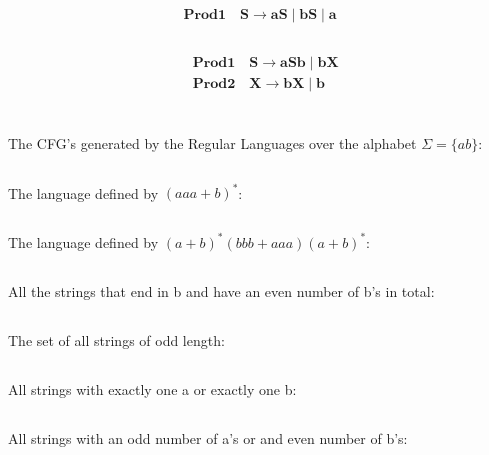 \documentclass[12pt,a4paper,oneside]{report}
\begin{document}
\section{}
\subsection{}
\begin{equation}
\mathbf {Prod 1 \quad  S \to aS \mid bS \mid a}
\end{equation}
\subsection{}
\begin{equation}
\begin{split}
&\mathbf {Prod 1 \quad  S \to aSb \mid bX}\\
&\mathbf{Prod 2 \quad X \to bX \mid b}
\end{split}
\end{equation}
\section{}
The CFG's generated by the Regular Languages over the alphabet $\Sigma = \{a b \}$:
\subsection{}
The language defined by $(aaa + b)^*$:
\subsection{}
The language defined by $(a + b)^*(bbb + aaa)(a + b)^*$:
\subsection{}
All the strings that end in b and have an even number of b's in total:
\subsection{}
The set of all strings of odd length:
\subsection{}
All strings with exactly one a or exactly one b:
\subsection{}
All strings with an odd number of a's or and even number of b's:
\end{document}
